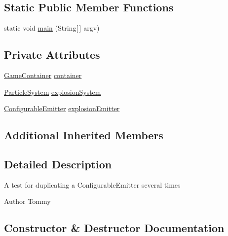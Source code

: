 \subsection*{Static Public Member Functions}
\begin{DoxyCompactItemize}
\item 
static void \mbox{\hyperlink{classorg_1_1newdawn_1_1slick_1_1tests_1_1_duplicate_emitter_test_a9b0522fd9e9367183c7fae456797525d}{main}} (String\mbox{[}$\,$\mbox{]} argv)
\end{DoxyCompactItemize}
\subsection*{Private Attributes}
\begin{DoxyCompactItemize}
\item 
\mbox{\hyperlink{classorg_1_1newdawn_1_1slick_1_1_game_container}{Game\+Container}} \mbox{\hyperlink{classorg_1_1newdawn_1_1slick_1_1tests_1_1_duplicate_emitter_test_a1bd68c36e7b1214aa3633db618e0a7c5}{container}}
\item 
\mbox{\hyperlink{classorg_1_1newdawn_1_1slick_1_1particles_1_1_particle_system}{Particle\+System}} \mbox{\hyperlink{classorg_1_1newdawn_1_1slick_1_1tests_1_1_duplicate_emitter_test_ad51ae06362283e4a70164d3be38c3ae6}{explosion\+System}}
\item 
\mbox{\hyperlink{classorg_1_1newdawn_1_1slick_1_1particles_1_1_configurable_emitter}{Configurable\+Emitter}} \mbox{\hyperlink{classorg_1_1newdawn_1_1slick_1_1tests_1_1_duplicate_emitter_test_a4dda8eb74bc929d5165d1463b5efc302}{explosion\+Emitter}}
\end{DoxyCompactItemize}
\subsection*{Additional Inherited Members}


\subsection{Detailed Description}
A test for duplicating a Configurable\+Emitter several times \begin{DoxyAuthor}{Author}
Tommy 
\end{DoxyAuthor}


\subsection{Constructor \& Destructor Documentation}
\mbox{\label{classorg_1_1newdawn_1_1slick_1_1tests_1_1_duplicate_emitter_test_a5f0beb98ae988b43e0960237b26cbb7d}} 
